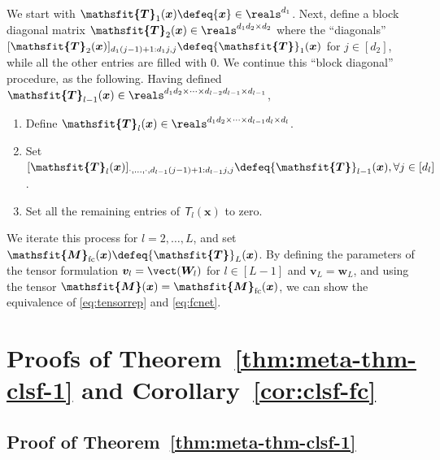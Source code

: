 \documentclass{article} %
\def\vr{{\bm{r}}}
\def\vv{{\bm{v}}}
\def\vw{{\bm{w}}}
\def\vx{{\bm{x}}}
\def\mW{{\bm{W}}}
\def\mX{{\bm{X}}}
\newcommand{\tens}[1]{\bm{\mathsfit{#1}}}
\def\tM{{\tens{M}}}
\def\tT{{\tens{T}}}
\newcommand{\bTheta}{\bm{\Theta}}
\newcommand{\tMfc}{\tM_{\rm fc}}
\begin{document}
We start with $\tT_1(\vx) \defeq \vx \in \reals^{d_1}$. Next, define a block diagonal matrix $\tT_2(\vx) \in \reals^{d_1 d_2 \times d_2}$ where the ``diagonals'' $[\tT_2(\vx)]_{d_1(j-1)+1:d_1 j,j} \defeq \tT_1(\vx)$ for $j\in[d_2]$, while all the other entries are filled with 0. We continue this ``block diagonal'' procedure, as the following. Having defined $\tT_{l-1}(\vx) \in \reals^{d_1d_2 \times \cdots \times d_{l-2}d_{l-1} \times d_{l-1}}$,
\begin{enumerate}
    \item Define $\tT_{l}(\vx) \in \reals^{d_1d_2 \times \cdots \times d_{l-1}d_{l} \times d_{l}}$.
    \item Set $[\tT_l(\vx)]_{\cdot,\dots,\cdot,d_{l-1}(j-1)+1:d_{l-1}j,j} \defeq \tT_{l-1}(\vx), \forall j \in [d_l]$.
    \item Set all the remaining entries of $\tT_l(\vx)$ to zero.
\end{enumerate}
We iterate this process for $l = 2, \dots, L$, and set $\tMfc(\vx) \defeq \tT_{L}(\vx)$.
By defining the parameters of the tensor formulation $\vv_l = \vect(\mW_l)$ for $l \in [L-1]$ and $\vv_L = \vw_L$, and using the tensor $\tM(\vx) = \tMfc(\vx)$, we can show the equivalence of \eqref{eq:tensorrep} and \eqref{eq:fcnet}.




\section{Proofs of Theorem~\ref{thm:meta-thm-clsf-1} and Corollary~\ref{cor:clsf-fc}}
\label{sec:proof-meta-thm-clsf-1}
\subsection{Proof of Theorem~\ref{thm:meta-thm-clsf-1}}
\end{document}
